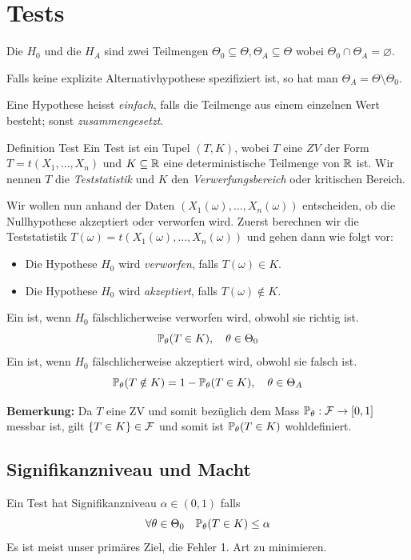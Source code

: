 \section{Tests}
\begin{subbox}{}
	Die  \(H_0\) und die  \(H_A\) sind zwei Teilmengen \(\Theta_0 \subseteq \Theta, \Theta_A \subseteq \Theta\) wobei \(\Theta_0 \cap \Theta_A = \varnothing\). 

	Falls keine explizite Alternativhypothese spezifiziert ist, so hat man $\Theta_A = \Theta \setminus \Theta_0$. 

	Eine Hypothese heisst \textit{einfach}, falls die Teilmenge aus einem einzelnen Wert besteht; sonst \textit{zusammengesetzt}.
\end{subbox}

\begin{mainbox}{Definition Test}
	Ein Test ist ein Tupel \((T,K)\), wobei \(T\) eine \(ZV\) der Form \(T=t(X_1, \ldots, X_n)\) und \(K \subseteq \R\) eine deterministische Teilmenge von \(\R\) ist. Wir nennen \(T\) die \textit{Teststatistik} und \(K\) den \textit{Verwerfungsbereich} oder kritischen Bereich.
\end{mainbox}

Wir wollen nun anhand der Daten \((X_1(\omega), \ldots, X_n(\omega))\) entscheiden, ob die Nullhypothese akzeptiert oder verworfen wird. Zuerst berechnen wir die Teststatistik \(T(\omega) = t(X_1(\omega), \ldots, X_n(\omega))\) und gehen dann wie folgt vor:
\begin{itemize}
	\item Die Hypothese \(H_0\) wird \textit{verworfen}, falls \(T(\omega) \in K\).
	\item Die Hypothese \(H_0\) wird \textit{akzeptiert}, falls \(T(\omega) \notin K\).
\end{itemize}
\begin{subbox}{}
	Ein  ist, wenn \(H_0\) fälschlicherweise verworfen wird, obwohl sie richtig ist.
	\[\P_\theta(T \in K), \quad \theta \in \Theta_0\]
	\noindent Ein  ist, wenn \(H_0\) fälschlicherweise akzeptiert wird, obwohl sie falsch ist.
	\[\P_\theta(T\notin K) = 1 - \P_\theta(T \in K), \quad \theta \in \Theta_A\]
\end{subbox}
\textbf{Bemerkung: } Da $T$ eine ZV und somit bezüglich dem Mass $\P_\theta: \F \to [0,1]$ messbar ist, gilt $\{T \in K\} \in \F$ und somit ist $\P_\theta(T \in K)$ wohldefiniert. 
\subsection{Signifikanzniveau und Macht}
Ein Test hat Signifikanzniveau \(\alpha \in (0,1)\) falls
\[\forall \theta \in \Theta_0 \quad \P_\theta(T \in K) \le \alpha\]
Es ist meist unser primäres Ziel, die Fehler 1. Art zu minimieren.

